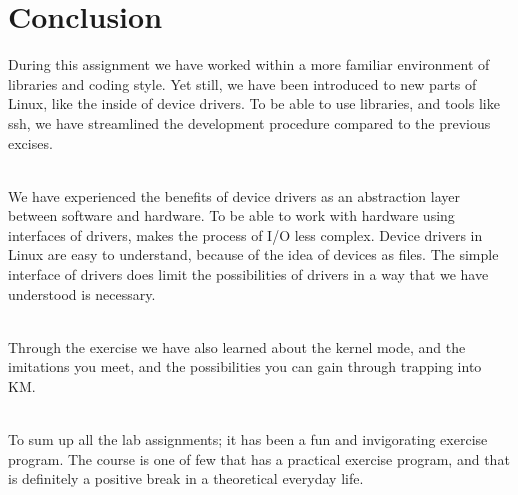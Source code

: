 \section{Conclusion}
During this assignment we have worked within a more familiar environment of  libraries and coding style. Yet still, we have been introduced to new parts of Linux, like the inside of device drivers. To be able to use libraries, and tools like ssh, we have streamlined the development procedure compared to the previous excises. 

\\We have experienced the benefits of device drivers as an abstraction layer between software and hardware. To be able to work with hardware using interfaces of drivers, makes the process of I/O less complex. Device drivers in Linux are easy to understand, because of the idea of devices as files. The simple interface of drivers does limit the possibilities of drivers in a way that we have understood is necessary.

\\Through the exercise we have also learned about the kernel mode, and the imitations you meet, and the possibilities you can gain through trapping into KM.

\\To sum up all the lab assignments; it has been a fun and invigorating exercise program. The course is one of few that has a practical exercise program, and that is definitely a positive break in a theoretical everyday life.

